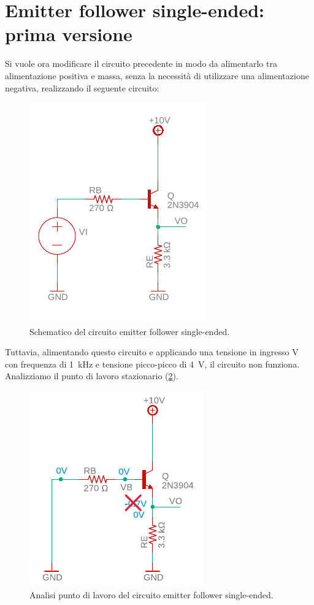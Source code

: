 \section{Emitter follower single-ended: prima versione}
Si vuole ora modificare il circuito precedente in modo da alimentarlo tra alimentazione positiva e massa, senza la necessità di utilizzare una alimentazione negativa, realizzando il seguente circuito:
\begin{figure}[h!]
	\centering
	\includegraphics[width=0.4\linewidth]{./OtherFiles/Laboratorio 2/emitter follower}
	\caption{Schematico del circuito emitter follower single-ended.}
	\label{fig:emitterfollwer_se}
\end{figure}
Tuttavia, alimentando questo circuito e applicando una tensione in ingresso V con frequenza di \SI{1}{\kilo\hertz} e tensione picco-picco di \SI{4}{\volt}, il circuito non funziona. Analizziamo il punto di lavoro stazionario (\Fig\ref{fig:emitterfollwer_se_DC}).
\begin{figure}[h!]
	\centering
	\includegraphics[width=0.4\linewidth]{./OtherFiles/Laboratorio 2/emitter follower_punto di lavoro-printout}
	\caption{Analisi punto di lavoro del circuito emitter follower single-ended.}
	\label{fig:emitterfollwer_se_DC}
\end{figure}
